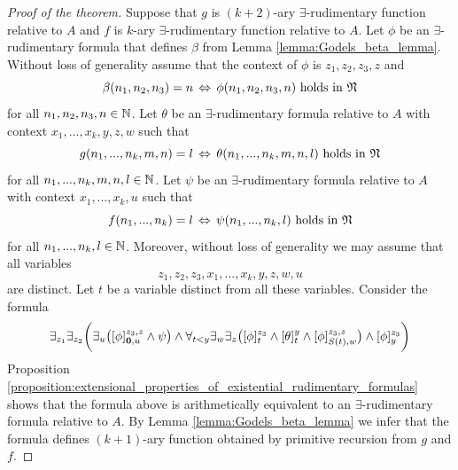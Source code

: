 \documentclass[10pt]{amsart}
\begin{document}
\begin{proof}[Proof of the theorem]
	Suppose that $g$ is $(k+2)$-ary $\exists$-rudimentary function relative to $A$ and $f$ is $k$-ary $\exists$-rudimentary function relative to $A$. Let $\phi$ be an $\exists$-rudimentary formula that defines $\beta$ from Lemma \ref{lemma:Godels_beta_lemma}. Without loss of generality assume that the context of $\phi$ is $z_1,z_2,z_3,z$ and
	$$\beta(n_1,n_2,n_3) = n\,\Leftrightarrow\,\phi(n_1,n_2,n_3,n)\mbox{ holds in }{\mathfrak N}$$
	for all $n_1,n_2,n_3,n\in {\mathbb N}$. Let $\theta$ be an $\exists$-rudimentary formula relative to $A$ with context $x_1,...,x_k,y,z,w$ such that
	$$g(n_1,...,n_k,m,n) = l\,\Leftrightarrow\,\theta(n_1,...,n_k,m,n,l)\mbox{ holds in }{\mathfrak N}$$
	for all $n_1,...,n_k,m,n,l\in {\mathbb N}$. Let $\psi$ be an $\exists$-rudimentary formula relative to $A$ with context $x_1,...,x_k,u$ such that
	$$f(n_1,...,n_k) = l\,\Leftrightarrow\,\psi(n_1,...,n_k,l)\mbox{ holds in }{\mathfrak N}$$
	for all $n_1,...,n_k,l\in {\mathbb N}$. Moreover, without loss of generality we may assume that all variables
	$$z_1,z_2,z_3,x_1,...,x_k,y,z,w,u$$
	are distinct. Let $t$ be a variable distinct from all these variables. Consider the formula
	$$\exists_{z_1}\exists_{z_2}\bigg(\exists_u\big([\phi]^{z_3,z}_{\mathbf{0},u}\wedge \psi\big)\wedge \forall_{t < y}\exists_w\exists_z\big([\phi]^{z_3}_{t}\wedge [\theta]^y_t \wedge [\phi]^{z_3,z}_{S(t),w}\big)\wedge [\phi]^{z_3}_y\bigg)$$
	Proposition \ref{proposition:extensional_properties_of_existential_rudimentary_formulas} shows that the formula above is arithmetically equivalent to an $\exists$-rudimentary formula relative to $A$. By Lemma \ref{lemma:Godels_beta_lemma} we infer that the formula defines $(k+1)$-ary function obtained by primitive recursion from $g$ and $f$.
\end{proof}
\end{document}
